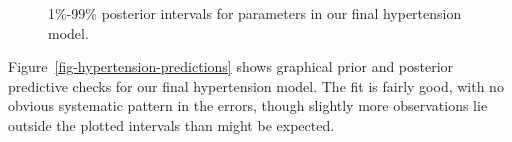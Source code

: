 \documentclass[
  letterpaper,
  DIV=11,
  numbers=noendperiod,
  oneside]{scrartcl}
\theoremstyle{plain}
\theoremstyle{remark}
\begin{document}
\begin{figure}


\caption{\label{fig-hypertension-parameters}1\%-99\% posterior intervals
for parameters in our final hypertension model.}

\end{figure}%

Figure~\ref{fig-hypertension-predictions} shows graphical prior and
posterior predictive checks for our final hypertension model. The fit is
fairly good, with no obvious systematic pattern in the errors, though
slightly more observations lie outside the plotted intervals than might
be expected.
\end{document}
